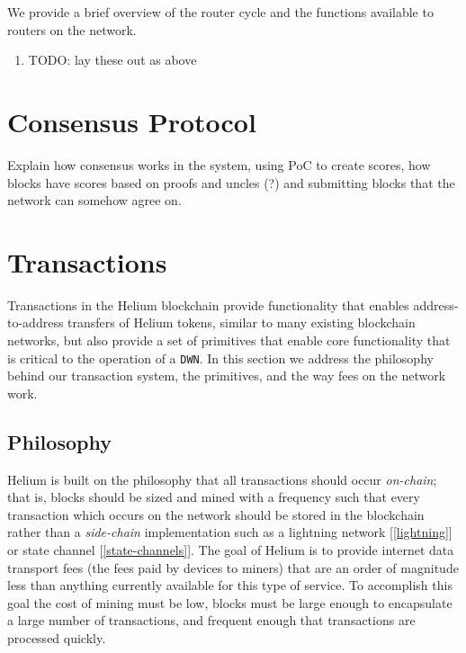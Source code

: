\documentclass[letterpaper,11pt]{article}
\newcommand{\todo}[1]{}
\renewcommand{\todo}[1]{{\color{red} TODO: {#1}}}
\begin{document}
We provide a brief overview of the router cycle and the functions available to routers on the network.

\begin{enumerate}
  \item \todo{lay these out as above}
\end{enumerate}

\newpage

\section{Consensus Protocol} \label{consensus}

Explain how consensus works in the system, using PoC to create scores, how blocks have scores based on proofs and uncles (?) and submitting blocks that the network can somehow agree on.

\newpage

\section{Transactions} \label{transactions}

Transactions in the Helium blockchain provide functionality that enables address-to-address transfers of Helium tokens, similar to many existing blockchain networks, but also provide a set of primitives that enable core functionality that is critical to the operation of a \verb|DWN|. In this section we address the philosophy behind our transaction system, the primitives, and the way fees on the network work.

\subsection{Philosophy}

Helium is built on the philosophy that all transactions should occur \emph{on-chain}; that is, blocks should be sized and mined with a frequency such that every transaction which occurs on the network should be stored in the blockchain rather than a \emph{side-chain} implementation such as a lightning network [\ref{lightning}] or state channel [\ref{state-channels}]. The goal of Helium is to provide internet data transport fees (the fees paid by devices to miners) that are an order of magnitude less than anything currently available for this type of service. To accomplish this goal the cost of mining must be low, blocks must be large enough to encapsulate a large number of transactions, and frequent enough that transactions are processed quickly.\newline
\end{document}
